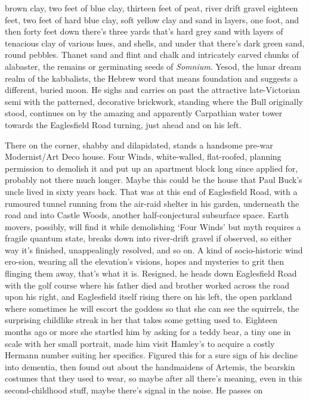 \documentclass[
]{article}
\begin{document}
brown clay, two feet of blue clay, thirteen feet of peat, river drift
gravel eighteen feet, two feet of hard blue clay, soft yellow clay and
sand in layers, one foot, and then forty feet down there's three yards
that's hard grey sand with layers of tenacious clay of various hues, and
shells, and under that there's dark green sand, round pebbles. Thanet
sand and flint and chalk and intricately carved chunks of alabaster, the
remains or germinating seeds of \emph{Somnium}. Yesod, the lunar dream
realm of the kabbalists, the Hebrew word that means foundation and
suggests a different, buried moon. He sighs and carries on past the
attractive late-Victorian semi with the patterned, decorative brickwork,
standing where the Bull originally stood, continues on by the amazing
and apparently Carpathian water tower towards the Eaglesfield Road
turning, just ahead and on his left. \par
There on the corner, shabby and dilapidated, stands a handsome
pre-war Modernist/Art Deco house. Four Winds, white-walled, flat-roofed,
planning permission to demolish it and put up an apartment block long
since applied for, probably not there much longer. Maybe this could be
the house that Paul Buck's uncle lived in sixty years back. That was at
this end of Eaglesfield Road, with a rumoured tunnel running from the
air-raid shelter in his garden, underneath the road and into Castle
Woods, another half-conjectural subsurface space. Earth movers,
possibly, will find it while demolishing `Four Winds' but myth requires
a fragile quantum state, breaks down into river-drift gravel if
observed, so either way it's finished, unappealingly resolved, and so
on. A kind of socio-historic wind ero-sion, wearing all the elevation's
visions, hopes and mysteries to grit then flinging them away, that's
what it is. Resigned, he heads down Eaglesfield Road with the golf
course where his father died and brother worked across the road upon his
right, and Eaglesfield itself rising there on his left, the open
parkland where sometimes he will escort the goddess so that she can see
the squirrels, the surprising childlike streak in her that takes some
getting used to. Eighteen months ago or more she startled him by asking
for a teddy bear, a tiny one in scale with her small portrait, made him
visit Hamley's to acquire a costly Hermann number suiting her specifics.
Figured this for a sure sign of his decline into dementia, then found
out about the handmaidens of Artemis, the bearskin costumes that they
used to wear, so maybe after all there's meaning, even in this
second-childhood stuff, maybe there's signal in the noise. He passes on
\end{document}
